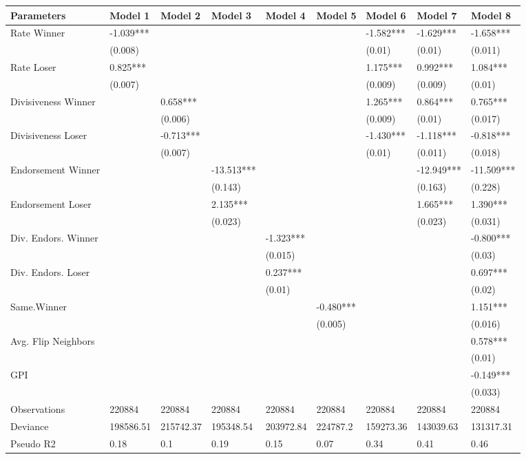 
\begin{tabular}{l|l|l|l|l|l|l|l|l}
\hline
Parameters & Model 1 & Model 2 & Model 3 & Model 4 & Model 5 & Model 6 & Model 7 & Model 8\\
\hline
Rate Winner & -1.039*** &  &  &  &  & -1.582*** & -1.629*** & -1.658***\\
\hline
 & (0.008) &  &  &  &  & (0.01) & (0.01) & (0.011)\\
\hline
Rate Loser & 0.825*** &  &  &  &  & 1.175*** & 0.992*** & 1.084***\\
\hline
 & (0.007) &  &  &  &  & (0.009) & (0.009) & (0.01)\\
\hline
Divisiveness Winner &  & 0.658*** &  &  &  & 1.265*** & 0.864*** & 0.765***\\
\hline
 &  & (0.006) &  &  &  & (0.009) & (0.01) & (0.017)\\
\hline
Divisiveness Loser &  & -0.713*** &  &  &  & -1.430*** & -1.118*** & -0.818***\\
\hline
 &  & (0.007) &  &  &  & (0.01) & (0.011) & (0.018)\\
\hline
Endorsement Winner &  &  & -13.513*** &  &  &  & -12.949*** & -11.509***\\
\hline
 &  &  & (0.143) &  &  &  & (0.163) & (0.228)\\
\hline
Endorsement Loser &  &  & 2.135*** &  &  &  & 1.665*** & 1.390***\\
\hline
 &  &  & (0.023) &  &  &  & (0.023) & (0.031)\\
\hline
Div. Endors. Winner &  &  &  & -1.323*** &  &  &  & -0.800***\\
\hline
 &  &  &  & (0.015) &  &  &  & (0.03)\\
\hline
Div. Endors. Loser &  &  &  & 0.237*** &  &  &  & 0.697***\\
\hline
 &  &  &  & (0.01) &  &  &  & (0.02)\\
\hline
Same.Winner &  &  &  &  & -0.480*** &  &  & 1.151***\\
\hline
 &  &  &  &  & (0.005) &  &  & (0.016)\\
\hline
Avg. Flip Neighbors &  &  &  &  &  &  &  & 0.578***\\
\hline
 &  &  &  &  &  &  &  & (0.01)\\
\hline
GPI &  &  &  &  &  &  &  & -0.149***\\
\hline
 &  &  &  &  &  &  &  & (0.033)\\
\hline
Observations & 220884 & 220884 & 220884 & 220884 & 220884 & 220884 & 220884 & 220884\\
\hline
Deviance & 198586.51 & 215742.37 & 195348.54 & 203972.84 & 224787.2 & 159273.36 & 143039.63 & 131317.31\\
\hline
Pseudo R2 & 0.18 & 0.1 & 0.19 & 0.15 & 0.07 & 0.34 & 0.41 & 0.46\\
\hline
\end{tabular}
